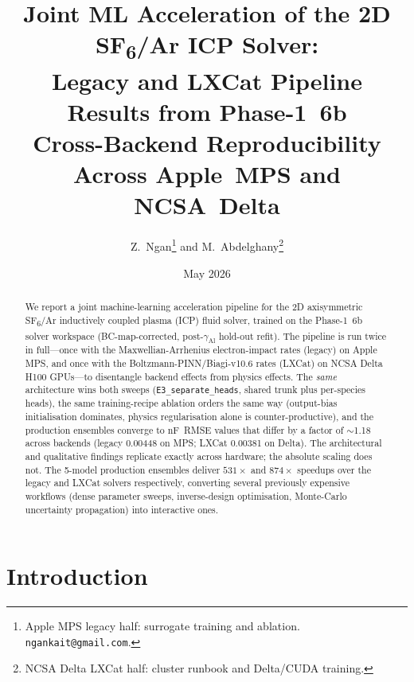 \documentclass[11pt,a4paper]{article}
\title{%
  Joint ML Acceleration of the 2D SF\textsubscript{6}/Ar ICP Solver:\\
  Legacy and LXCat Pipeline Results from Phase-1~6b\\[2pt]
  \large Cross-Backend Reproducibility Across Apple~MPS and NCSA~Delta}
\author{%
  Z.\ Ngan\thanks{Apple MPS legacy half:
    surrogate training and ablation. \texttt{ngankait@gmail.com}.}
  \quad and \quad
  M.\ Abdelghany\thanks{NCSA Delta LXCat half:
    cluster runbook and Delta/CUDA training.}}
\date{May 2026}
\begin{document}
\maketitle

\begin{abstract}
We report a joint machine-learning acceleration pipeline for the 2D
axisymmetric SF\textsubscript{6}/Ar inductively coupled plasma (ICP)
fluid solver, trained on the Phase-1~6b solver workspace
(BC-map-corrected, post-$\gamma_\mathrm{Al}$ hold-out refit).  The
pipeline is run twice in full---once with the Maxwellian-Arrhenius
electron-impact rates (legacy) on Apple MPS, and once with the
Boltzmann-PINN/Biagi-v10.6 rates (LXCat) on NCSA Delta H100
GPUs---to disentangle backend effects from physics effects.  The
\emph{same} architecture wins both sweeps (\texttt{E3\_separate\_heads},
shared trunk plus per-species heads), the same training-recipe
ablation orders the same way (output-bias initialisation dominates,
physics regularisation alone is counter-productive), and the
production ensembles converge to nF~RMSE values that differ by a
factor of $\sim$1.18 across backends (legacy 0.00448 on MPS;
LXCat 0.00381 on Delta).  The architectural and qualitative findings
replicate exactly across hardware; the absolute scaling does not.
The 5-model production ensembles deliver $531\times$ and $874\times$
speedups over the legacy and LXCat solvers respectively, converting
several previously expensive workflows (dense parameter sweeps,
inverse-design optimisation, Monte-Carlo uncertainty propagation)
into interactive ones.
\end{abstract}

\newpage
\tableofcontents
\newpage

\section{Introduction}
\label{sec:intro}
\end{document}
